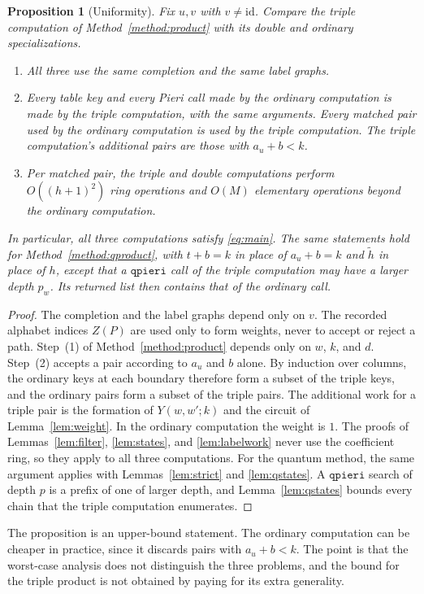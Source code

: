 \documentclass{amsart}
\newtheorem{proposition}[theorem]{Proposition}
\theoremstyle{definition}
\theoremstyle{remark}
\numberwithin{equation}{section}
\newcommand{\id}{\mathrm{id}}
\begin{document}
\begin{proposition}[Uniformity]\label{prop:uniform}
Fix $u,v$ with $v\ne\id$.
Compare the triple computation of Method~\ref{method:product} with its
double and ordinary specializations.
\begin{enumerate}
\item All three use the same completion and the same label graphs.
\item Every table key and every Pieri call made by the ordinary
computation is made by the triple computation, with the same arguments.
Every matched pair used by the ordinary computation is used by the
triple computation.
The triple computation's additional pairs are those with $a_u+b<k$.
\item Per matched pair, the triple and double computations perform
$O((h+1)^2)$ ring operations and $O(M)$ elementary operations beyond
the ordinary computation.
\end{enumerate}
In particular, all three computations satisfy \eqref{eq:main}.
The same statements hold for Method~\ref{method:qproduct}, with
$t+b=k$ in place of $a_u+b=k$ and $\tilde h$ in place of $h$, except
that a $\mathtt{qpieri}$ call of the triple computation may have a
larger depth $p_w$. Its returned list then contains that of the
ordinary call.
\end{proposition}
\begin{proof}
The completion and the label graphs depend only on $v$.
The recorded alphabet indices $Z(P)$ are used only to form weights,
never to accept or reject a path.
Step~(1) of Method~\ref{method:product} depends only on $w$, $k$, and $d$.
Step~(2) accepts a pair according to $a_u$ and $b$ alone.
By induction over columns, the ordinary keys at each boundary therefore
form a subset of the triple keys, and the ordinary pairs form a subset
of the triple pairs.
The additional work for a triple pair is the formation of $Y(w,w';k)$
and the circuit of Lemma~\ref{lem:weight}.
In the ordinary computation the weight is $1$.
The proofs of Lemmas~\ref{lem:filter}, \ref{lem:states}, and
\ref{lem:labelwork} never use the coefficient ring, so they apply to all
three computations.
For the quantum method, the same argument applies with
Lemmas~\ref{lem:strict} and \ref{lem:qstates}.
A $\mathtt{qpieri}$ search of depth $p$ is a prefix of one of larger
depth, and Lemma~\ref{lem:qstates} bounds every chain that the
triple computation enumerates.
\end{proof}

The proposition is an upper-bound statement.
The ordinary computation can be cheaper in practice, since it discards
pairs with $a_u+b<k$.
The point is that the worst-case analysis does not distinguish the
three problems, and the bound for the triple product is not obtained by
paying for its extra generality.
\end{document}
